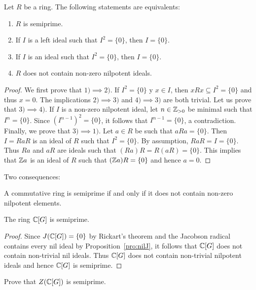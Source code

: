 \begin{proposition}
	Let $R$ be a ring. The following statements are equivalents: 
	\begin{enumerate}
		\item $R$ is semiprime.
		\item If $I$ is a left ideal such that $I^2=\{0\}$, then $I=\{0\}$.
		\item If $I$ is an ideal such that $I^2=\{0\}$, then $I=\{0\}$.
		\item $R$ does not contain non-zero nilpotent ideals.
	\end{enumerate}
\end{proposition}

\begin{proof}
	We first prove that $1)\implies2)$. If $I^2=\{0\}$ y $x\in I$, then
	$xRx\subseteq I^2=\{0\}$ and thus $x=0$. The implications $2)\implies3)$
	and $4)\implies3)$ are both trivial. Let us prove that $3)\implies4)$.  If
	$I$ is a non-zero nilpotent ideal, let $n\in\mathbb{Z}_{>0}$ be minimal such that
	$I^n=\{0\}$.  Since $(I^{n-1})^2=\{0\}$, it follows that $I^{n-1}=\{0\}$, a
	contradiction.  Finally, we prove that $3)\implies1)$. Let $a\in R$ be such
	that $aRa=\{0\}$. Then $I=RaR$ is an ideal of $R$ such that $I^2=\{0\}$. By
	assumption, $RaR=I=\{0\}$. Thus $Ra$ and $aR$ are ideals such that
	$(Ra)R=R(aR)=\{0\}$. This implies that $\mathbb{Z} a$ is an ideal of $R$ such that
	$(\mathbb{Z} a)R=\{0\}$ and hence $a=0$.
\end{proof}

Two consequences:

\begin{corollary}
	A commutative ring is semiprime if and only if it does not contain non-zero
	nilpotent elements. 
\end{corollary}

\begin{corollary}
	The ring $\mathbb{C}[G]$ is semiprime.
\end{corollary}

\begin{proof}
	Since $J(\mathbb{C}[G])=\{0\}$ by Rickart's theorem and the Jacobson radical
	contains every nil ideal by Proposition~\ref{pro:nilJ}, it follows that
	$\mathbb{C}[G]$ does not contain non-trivial nil ideals. Thus $\mathbb{C}[G]$ does not
	contain non-trivial nilpotent ideals and hence $\mathbb{C}[G]$ is semiprime.
\end{proof}

\begin{exercise}
	Prove that $Z(\mathbb{C}[G])$ is semiprime.
\end{exercise}

